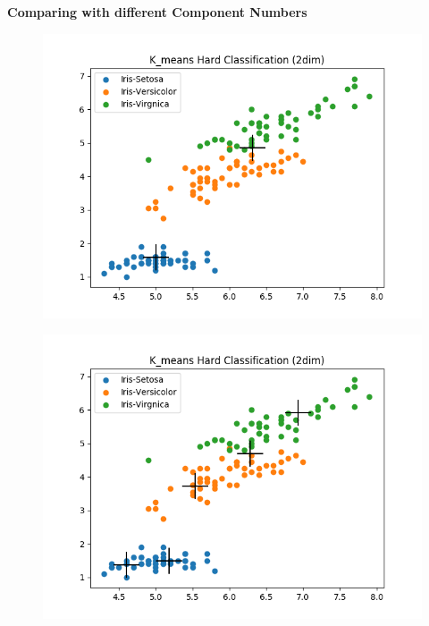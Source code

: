 \documentclass[a4paper]{article}
\begin{document}
\begin{enumerate}
\newpage

{\large \textbf{Comparing with different Component Numbers}} \\


\begin{figure}[htp]
\centering
\begin{minipage}{0.4\textwidth}
  \includegraphics[scale=0.5]{plots/kmeans_sc1_c2.png}
  \label{fig:16}
\end{minipage}
\hfill
\begin{minipage}{0.4\textwidth}
  \includegraphics[scale=0.5]{plots/kmeans_sc1_c5.png}
  \label{fig:17}
\end{minipage}
\end{figure} 


\end{enumerate}
\end{document}
